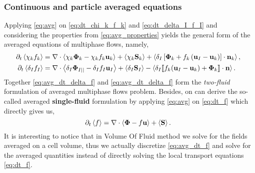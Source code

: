 \subsubsection*{Continuous and particle averaged equations}
Applying \ref{eq:avg} on \ref{eq:dt_chi_k_f_k} and \ref{eq:dt_delta_I_f_I} and considering the properties from \ref{eq:avg_properties} yields the general form of the averaged equations of multiphase flows, namely,
\begin{align}
    \partial_t \left<\chi_k f_k\right>
    &= \mathbf{\nabla} \cdot \left<\chi_k \mathbf{\Phi}_k - \chi_k f_k \textbf{u}_k\right>
    + \left<\chi_k \textbf{S}_k\right>
    + \left<\delta_I\left[
        \mathbf{\Phi}_k
        + f_k
        \left(
            \textbf{u}_I
            - \textbf{u}_k
        \right)
    \right]
    \cdot \textbf{n}_k\right> ,
    \label{eq:avg_dt_chi_f}\\
    \partial_t \left<\delta_If_I\right>
    &= 
    \mathbf{\nabla} \cdot \left<\delta_I \mathbf{\Phi}_{I||} - \delta_I f_I \textbf{u}_I\right>
    +\left<\delta_I\textbf{S}_I\right> 
    - \left<\delta_I \llbracket 
    f_k (\textbf{u}_I - \textbf{u}_k)
    + \mathbf{\Phi}_k
     \rrbracket \cdot \textbf{n} \right>.
    \label{eq:avg_dt_delta_f}
\end{align}
Together \ref{eq:avg_dt_delta_f}  and \ref{eq:avg_dt_delta_f} form the \textit{two-fluid} formulation of averaged multiphase flows problem. 
Besides, on can derive the so-called averaged \textbf{single-fluid} formulation by applying \ref{eq:avg} on \ref{eq:dt_f} which directly gives us, 
\begin{equation}
    \partial_t \left<f\right>
    = \mathbf{\nabla} \cdot \left<\mathbf{\Phi} - f \textbf{u}\right>
    + \left<\textbf{S}\right>.
    \label{eq:avg_dt_f}
\end{equation}
It is interesting to notice that in Volume Of Fluid method we solve for the fields averaged on a cell volume, thus we actually discretize \ref{eq:avg_dt_f} and solve for the averaged quantities \citep{popinet2018numerical,tryggvason2011direct} instead of directly solving the local transport equations \ref{eq:dt_f}.

